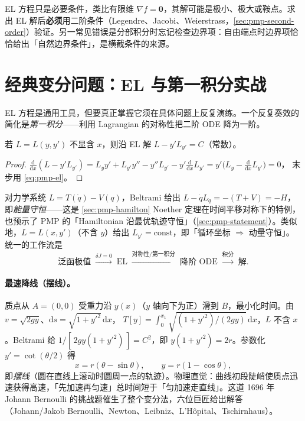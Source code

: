 \begin{pitfall}
EL 方程只是必要条件，类比有限维 $\nabla f=\mathbf 0$，其解可能是极小、极大或鞍点。求出 EL 解后\textbf{必须}用二阶条件（Legendre、Jacobi、Weierstrass，\cref{sec:pmp-second-order}）验证。另一常见错误是分部积分时忘记检查边界项：自由端点时边界项恰恰给出「自然边界条件」，是横截条件的来源。
\end{pitfall}

\section{经典变分问题：EL 与第一积分实战}
\label{sec:pmp-classics}

EL 方程是通用工具，但要真正掌握它须在具体问题上反复演练。一个反复奏效的简化是\emph{第一积分}——利用 Lagrangian 的对称性把二阶 ODE 降为一阶。

\begin{theorem}\label{thm:pmp-beltrami}
若 $L=L(y,y')$ 不显含 $x$，则沿 EL 解 $L-y'L_{y'}=C$（常数）。
\end{theorem}

\begin{proof}
$\tfrac{\mathrm d}{\mathrm dx}(L-y'L_{y'})=L_yy'+L_{y'}y''-y''L_{y'}-y'\tfrac{\mathrm d}{\mathrm dx}L_{y'}=y'\big(L_y-\tfrac{\mathrm d}{\mathrm dx}L_{y'}\big)=0$，
末步用 \cref{eq:pmp-el}。
\end{proof}

对力学系统 $L=T(\dot q)-V(q)$，Beltrami 给出 $L-\dot qL_{\dot q}=-(T+V)=-H$，即\emph{能量守恒}——这是 \cref{sec:pmp-hamilton} Noether 定理在时间平移对称下的特例，也预示了 PMP 的「Hamiltonian 沿最优轨迹守恒」（\cref{sec:pmp-statement}）。类似地，$L=L(x,y')$（不含 $y$）给出 $L_{y'}=\text{const}$，即「循环坐标 $\Rightarrow$ 动量守恒」。统一的工作流是
\begin{equation}
  \text{泛函极值}\;\xrightarrow{\delta J=0}\;\text{EL}\;\xrightarrow{\text{对称性/第一积分}}\;\text{降阶 ODE}\;\xrightarrow{\text{积分}}\;\text{解.}
  \label{eq:pmp-workflow}
\end{equation}

\paragraph{最速降线（摆线）。}
质点从 $A=(0,0)$ 受重力沿 $y(x)$（$y$ 轴向下为正）滑到 $B$，最小化时间。由 $v=\sqrt{2gy}$、$\mathrm ds=\sqrt{1+y'^2}\,\mathrm dx$，
$T[y]=\int_0^{x_1}\sqrt{(1+y'^2)/(2gy)}\,\mathrm dx$，$L$ 不含 $x$。Beltrami 给 $1/[\,2gy(1+y'^2)\,]=C^2$，即 $y(1+y'^2)=2r$。参数化 $y'=\cot(\theta/2)$ 得
\begin{equation}
  x=r(\theta-\sin\theta),\qquad y=r(1-\cos\theta),
  \label{eq:pmp-cycloid}
\end{equation}
即\emph{摆线}（圆在直线上滚动时圆周一点的轨迹）。物理直觉：曲线初段陡峭使质点迅速获得高速，「先加速再匀速」总时间短于「匀加速走直线」。这道 1696 年 Johann Bernoulli 的挑战题催生了整个变分法，六位巨匠给出解答（Johann/Jakob Bernoulli、Newton、Leibniz、L'Hôpital、Tschirnhaus）\cite{sussmann1997threehundred}。

